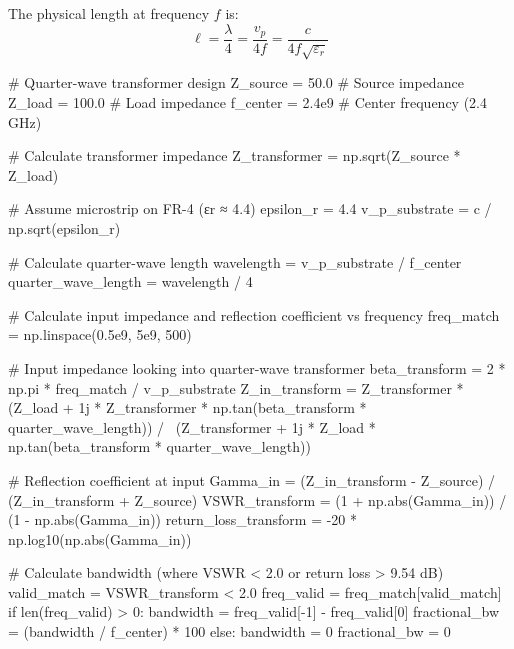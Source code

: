 \documentclass[11pt,a4paper]{article}
\begin{document}
The physical length at frequency $f$ is:
\begin{equation}
\ell = \frac{\lambda}{4} = \frac{v_p}{4f} = \frac{c}{4f\sqrt{\varepsilon_r}}
\end{equation}

\begin{pycode}
# Quarter-wave transformer design
Z_source = 50.0  # Source impedance
Z_load = 100.0   # Load impedance
f_center = 2.4e9  # Center frequency (2.4 GHz)

# Calculate transformer impedance
Z_transformer = np.sqrt(Z_source * Z_load)

# Assume microstrip on FR-4 (εr ≈ 4.4)
epsilon_r = 4.4
v_p_substrate = c / np.sqrt(epsilon_r)

# Calculate quarter-wave length
wavelength = v_p_substrate / f_center
quarter_wave_length = wavelength / 4

# Calculate input impedance and reflection coefficient vs frequency
freq_match = np.linspace(0.5e9, 5e9, 500)

# Input impedance looking into quarter-wave transformer
beta_transform = 2 * np.pi * freq_match / v_p_substrate
Z_in_transform = Z_transformer * (Z_load + 1j * Z_transformer * np.tan(beta_transform * quarter_wave_length)) / \
                 (Z_transformer + 1j * Z_load * np.tan(beta_transform * quarter_wave_length))

# Reflection coefficient at input
Gamma_in = (Z_in_transform - Z_source) / (Z_in_transform + Z_source)
VSWR_transform = (1 + np.abs(Gamma_in)) / (1 - np.abs(Gamma_in))
return_loss_transform = -20 * np.log10(np.abs(Gamma_in))

# Calculate bandwidth (where VSWR < 2.0 or return loss > 9.54 dB)
valid_match = VSWR_transform < 2.0
freq_valid = freq_match[valid_match]
if len(freq_valid) > 0:
    bandwidth = freq_valid[-1] - freq_valid[0]
    fractional_bw = (bandwidth / f_center) * 100
else:
    bandwidth = 0
    fractional_bw = 0


\end{pycode}
\end{document}
